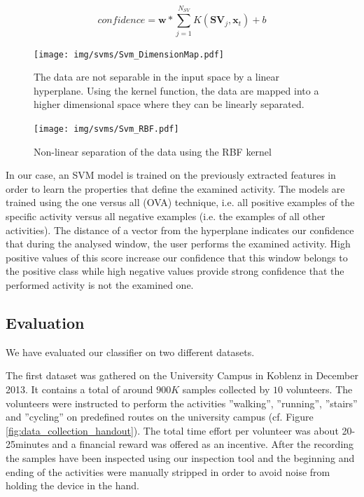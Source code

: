 \begin{equation}\label{Eq:SVMdecision}
  confidence = \mathbf{w}*\sum_{j=1}^{N_{SV}}{K(\mathbf{SV}_j,\mathbf{x}_t)}+b
\end{equation}

\begin{figure}[h]
\centering
  \texttt{[image: img/svms/Svm\_DimensionMap.pdf]}
  \caption{The data are not separable in the input space by a linear hyperplane. Using the kernel function, the data are mapped into a higher dimensional space where they can be linearly separated.}
  \label{fig:svm_highDim}
\end{figure}

\begin{figure}[h]
\centering
  \texttt{[image: img/svms/Svm\_RBF.pdf]}
  \caption{Non-linear separation of the data using the RBF kernel}
  \label{fig:svm_rbf}
\end{figure}


In our case, an SVM model is trained on the previously extracted
features in order to learn the properties that define the examined
activity. The models are trained using the one versus all (OVA)
technique, i.e. all positive examples of the specific activity versus
all negative examples (i.e. the examples of all other activities). The
distance of a vector from the hyperplane indicates our confidence that
during the analysed window, the user performs the examined
activity. High positive values of this score increase our confidence
that this window belongs to the positive class while high negative
values provide strong confidence that the performed activity is not
the examined one.


\subsection{Evaluation}\label{sec:har_eval}

We have evaluated our classifier on two different datasets.

The first dataset was gathered on the University Campus in Koblenz in
December 2013.  It contains a total of around $900K$ samples collected
by $10$ volunteers.  The volunteers were instructed to perform the
activities ''walking'', ''running'', ''stairs'' and ''cycling'' on
predefined routes on the university campus (cf. Figure
\ref{fig:data_collection_handout}). The total time effort per
volunteer was about 20-25minutes and a financial reward was offered as
an incentive. After the recording the samples have been inspected
using our inspection tool and the beginning and ending of the
activities were manually stripped in order to avoid noise from holding
the device in the hand.

